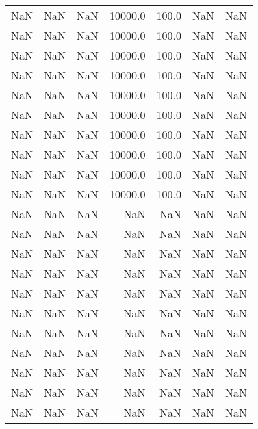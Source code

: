 \begin{tabular}{rrrrrrr}
     NaN &         NaN &         NaN & 10000.0 & 100.0 &          NaN &      NaN \\
     NaN &         NaN &         NaN & 10000.0 & 100.0 &          NaN &      NaN \\
     NaN &         NaN &         NaN & 10000.0 & 100.0 &          NaN &      NaN \\
     NaN &         NaN &         NaN & 10000.0 & 100.0 &          NaN &      NaN \\
     NaN &         NaN &         NaN & 10000.0 & 100.0 &          NaN &      NaN \\
     NaN &         NaN &         NaN & 10000.0 & 100.0 &          NaN &      NaN \\
     NaN &         NaN &         NaN & 10000.0 & 100.0 &          NaN &      NaN \\
     NaN &         NaN &         NaN & 10000.0 & 100.0 &          NaN &      NaN \\
     NaN &         NaN &         NaN & 10000.0 & 100.0 &          NaN &      NaN \\
     NaN &         NaN &         NaN & 10000.0 & 100.0 &          NaN &      NaN \\
     NaN &         NaN &         NaN &     NaN &   NaN &          NaN &      NaN \\
     NaN &         NaN &         NaN &     NaN &   NaN &          NaN &      NaN \\
     NaN &         NaN &         NaN &     NaN &   NaN &          NaN &      NaN \\
     NaN &         NaN &         NaN &     NaN &   NaN &          NaN &      NaN \\
     NaN &         NaN &         NaN &     NaN &   NaN &          NaN &      NaN \\
     NaN &         NaN &         NaN &     NaN &   NaN &          NaN &      NaN \\
     NaN &         NaN &         NaN &     NaN &   NaN &          NaN &      NaN \\
     NaN &         NaN &         NaN &     NaN &   NaN &          NaN &      NaN \\
     NaN &         NaN &         NaN &     NaN &   NaN &          NaN &      NaN \\
     NaN &         NaN &         NaN &     NaN &   NaN &          NaN &      NaN \\
     NaN &         NaN &         NaN &     NaN &   NaN &          NaN &      NaN \\

\end{tabular}
